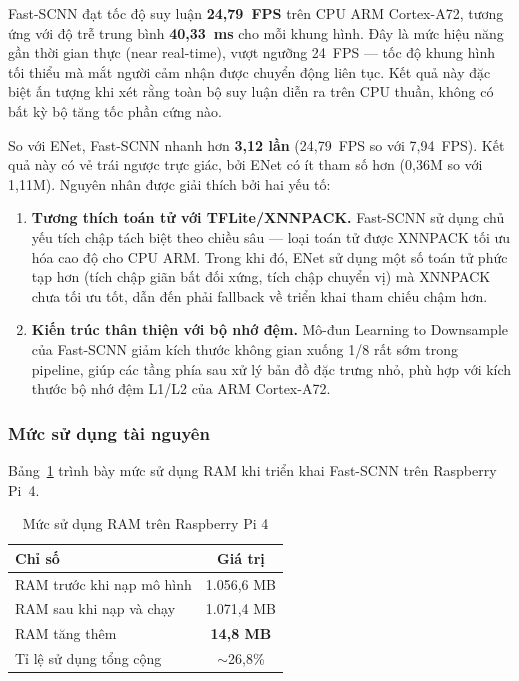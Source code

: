 \documentclass[conference]{IEEEtran}
\begin{document}
Fast-SCNN đạt tốc độ suy luận \textbf{24,79~FPS} trên CPU ARM Cortex-A72, tương ứng với độ trễ trung bình \textbf{40,33~ms} cho mỗi khung hình. Đây là mức hiệu năng gần thời gian thực (near real-time), vượt ngưỡng 24~FPS --- tốc độ khung hình tối thiểu mà mắt người cảm nhận được chuyển động liên tục. Kết quả này đặc biệt ấn tượng khi xét rằng toàn bộ suy luận diễn ra trên CPU thuần, không có bất kỳ bộ tăng tốc phần cứng nào.

So với ENet, Fast-SCNN nhanh hơn \textbf{3,12 lần} (24,79~FPS so với 7,94~FPS). Kết quả này có vẻ trái ngược trực giác, bởi ENet có ít tham số hơn (0,36M so với 1,11M). Nguyên nhân được giải thích bởi hai yếu tố:

\begin{enumerate}
  \item \textbf{Tương thích toán tử với TFLite/XNNPACK.} Fast-SCNN sử dụng chủ yếu tích chập tách biệt theo chiều sâu --- loại toán tử được XNNPACK tối ưu hóa cao độ cho CPU ARM. Trong khi đó, ENet sử dụng một số toán tử phức tạp hơn (tích chập giãn bất đối xứng, tích chập chuyển vị) mà XNNPACK chưa tối ưu tốt, dẫn đến phải fallback về triển khai tham chiếu chậm hơn.
  \item \textbf{Kiến trúc thân thiện với bộ nhớ đệm.} Mô-đun Learning to Downsample của Fast-SCNN giảm kích thước không gian xuống 1/8 rất sớm trong pipeline, giúp các tầng phía sau xử lý bản đồ đặc trưng nhỏ, phù hợp với kích thước bộ nhớ đệm L1/L2 của ARM Cortex-A72.
\end{enumerate}

\subsubsection{Mức sử dụng tài nguyên}

Bảng~\ref{tab:ram} trình bày mức sử dụng RAM khi triển khai Fast-SCNN trên Raspberry Pi~4.

\begin{table}[htbp]
\centering
\caption{Mức sử dụng RAM trên Raspberry Pi 4}
\label{tab:ram}
\begin{tabular}{lc}
\toprule
\textbf{Chỉ số} & \textbf{Giá trị} \\
\midrule
RAM trước khi nạp mô hình   & 1.056,6 MB \\
RAM sau khi nạp và chạy      & 1.071,4 MB \\
RAM tăng thêm                & \textbf{14,8 MB} \\
Tỉ lệ sử dụng tổng cộng    & $\sim$26,8\% \\
\bottomrule
\end{tabular}
\end{table}
\end{document}
